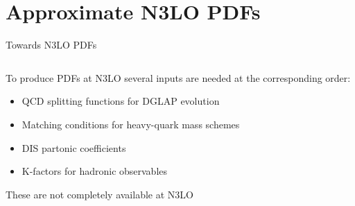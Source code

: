 \documentclass[aspectratio=169, 8pt,t]{beamer}
\begin{document}
\section{Approximate N3LO PDFs}

\begin{frame}{Towards N3LO PDFs}
  \begin{columns}[T]
    \begin{column}{0.59\textwidth}
      To produce PDFs at N3LO several inputs are needed at the corresponding order:
      \begin{itemize}
        \item QCD splitting functions for DGLAP evolution
        \item Matching conditions for heavy-quark mass schemes
        \item DIS partonic coefficients
        \item K-factors for hadronic observables
      \end{itemize}
    
      These are not completely available at N3LO
    

\end{column}
\end{columns}
\end{frame}
\end{document}

